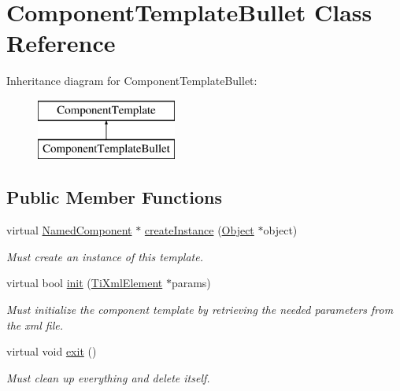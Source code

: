 \hypertarget{classComponentTemplateBullet}{
\section{\-Component\-Template\-Bullet \-Class \-Reference}
\label{d9/dc9/classComponentTemplateBullet}
}
\-Inheritance diagram for \-Component\-Template\-Bullet\-:\begin{figure}[H]
\begin{center}
\leavevmode
\includegraphics[height=2.000000cm]{d9/dc9/classComponentTemplateBullet}
\end{center}
\end{figure}
\subsection*{\-Public \-Member \-Functions}
\begin{DoxyCompactItemize}
\item 
\hypertarget{classComponentTemplateBullet_ab5fad6535a08fc993f683baa2eac9cf3}{
virtual \hyperlink{classNamedComponent}{\-Named\-Component} $\ast$ \hyperlink{classComponentTemplateBullet_ab5fad6535a08fc993f683baa2eac9cf3}{create\-Instance} (\hyperlink{classObject}{\-Object} $\ast$object)}
\label{d9/dc9/classComponentTemplateBullet_ab5fad6535a08fc993f683baa2eac9cf3}

\begin{DoxyCompactList}\small\item\em \-Must create an instance of this template. \end{DoxyCompactList}\item 
\hypertarget{classComponentTemplateBullet_a716de205fb16272a8fc11f612486116d}{
virtual bool \hyperlink{classComponentTemplateBullet_a716de205fb16272a8fc11f612486116d}{init} (\hyperlink{classTiXmlElement}{\-Ti\-Xml\-Element} $\ast$params)}
\label{d9/dc9/classComponentTemplateBullet_a716de205fb16272a8fc11f612486116d}

\begin{DoxyCompactList}\small\item\em \-Must initialize the component template by retrieving the needed parameters from the xml file. \end{DoxyCompactList}\item 
\hypertarget{classComponentTemplateBullet_a842bfcbe0a867cfbbc4b1157e15c15d9}{
virtual void \hyperlink{classComponentTemplateBullet_a842bfcbe0a867cfbbc4b1157e15c15d9}{exit} ()}
\label{d9/dc9/classComponentTemplateBullet_a842bfcbe0a867cfbbc4b1157e15c15d9}

\begin{DoxyCompactList}\small\item\em \-Must clean up everything and delete itself. \end{DoxyCompactList}\end{DoxyCompactItemize}
